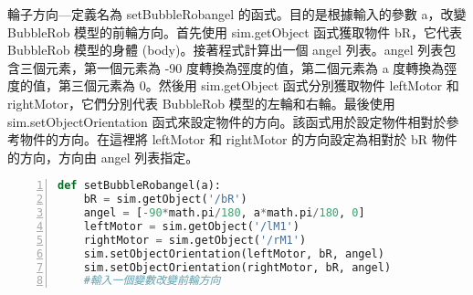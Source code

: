 輪子方向---定義名為 setBubbleRobangel 的函式。目的是根據輸入的參數 a，改變 BubbleRob 模型的前輪方向。首先使用 sim.getObject 函式獲取物件 bR，它代表 BubbleRob 模型的身體 (body)。接著程式計算出一個 angel 列表。angel 列表包含三個元素，第一個元素為 -90 度轉換為弳度的值，第二個元素為 a 度轉換為弳度的值，第三個元素為 0。然後用 sim.getObject 函式分別獲取物件 leftMotor 和 rightMotor，它們分別代表 BubbleRob 模型的左輪和右輪。最後使用 sim.setObjectOrientation 函式來設定物件的方向。該函式用於設定物件相對於參考物件的方向。在這裡將 leftMotor 和 rightMotor 的方向設定為相對於 bR 物件的方向，方向由 angel 列表指定。
\begin{lstlisting}[language=Python, frame=single, numbers=left, captionpos=b, basicstyle=\ttfamily\small,showstringspaces=false, breaklines=true, tabsize=4, xleftmargin=15pt]
def setBubbleRobangel(a):
    bR = sim.getObject('/bR')
    angel = [-90*math.pi/180, a*math.pi/180, 0]
    leftMotor = sim.getObject('/lM1')
    rightMotor = sim.getObject('/rM1')
    sim.setObjectOrientation(leftMotor, bR, angel)
    sim.setObjectOrientation(rightMotor, bR, angel)
    #輸入一個變數改變前輪方向
\end{lstlisting}

